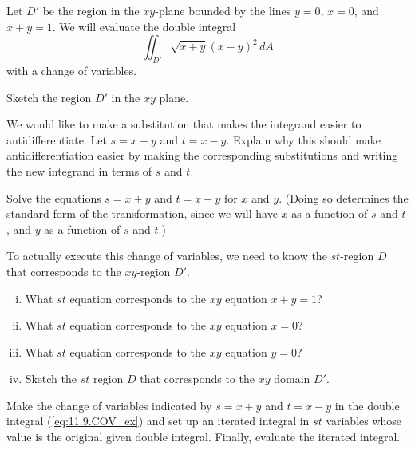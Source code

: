 \begin{activity} \label{A:11.9.4} Let $D'$ be the region in the $xy$-plane bounded by the lines $y=0$, $x=0$, and $x+y=1$. We will evaluate the double integral
\begin{equation}
\iint_{D'} \sqrt{x+y}(x-y)^2 \, dA \label{eq:11.9.COV_ex}
\end{equation}
with a change of variables.
	\ba
	\item Sketch the region $D'$ in the $xy$ plane.
	
	\item We would like to make a substitution that makes the integrand easier to antidifferentiate. Let $s = x+y$ and $t = x-y$. Explain why this should make antidifferentiation easier by making the corresponding substitutions and writing the new integrand in terms of $s$ and $t$.

	\item Solve the equations $s = x+y$ and $t = x-y$ for $x$ and $y$. (Doing so determines the standard form of the transformation, since we will have $x$ as a function of $s$ and $t$, and $y$ as a function of $s$ and $t$.)

	\item To actually execute this change of variables, we need to know the $st$-region $D$ that corresponds to the $xy$-region $D'$.
		\begin{enumerate}[i.]
		\item What $st$ equation corresponds to the $xy$ equation $x+y=1$?
		
		\item What $st$ equation corresponds to the $xy$ equation $x=0$?
		
		\item What $st$ equation corresponds to the $xy$ equation $y=0$?
		
		\item Sketch the $st$ region $D$ that corresponds to the $xy$ domain $D'$.
			
		\end{enumerate}
		
	\item Make the change of variables indicated by $s = x+y$ and $t = x-y$ in the double integral (\ref{eq:11.9.COV_ex}) and set up an iterated integral in $st$ variables whose value is the original given double integral. Finally, evaluate the iterated integral.
	
	
	
	\ea

\end{activity}

